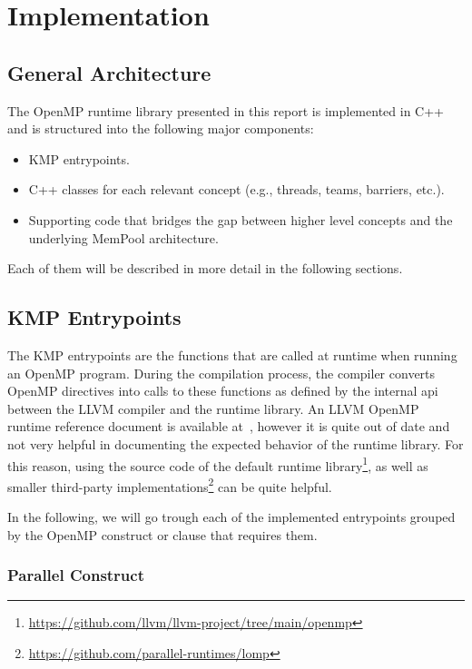 \chapter{Implementation}
\label{ch:implementation}

\section{General Architecture}
\label{sec:general-architecture}

The OpenMP runtime library presented in this report is implemented in C++ and is structured into
the following major components:

\begin{itemize}
	\item KMP entrypoints.
	\item C++ classes for each relevant concept (e.g., threads, teams, barriers, etc.).
	\item Supporting code that bridges the gap between higher level concepts and the underlying
	      MemPool architecture.
\end{itemize}

Each of them will be described in more detail in the following sections.

\section{KMP Entrypoints}
\label{sec:kmp-entrypoints}

The KMP entrypoints are the functions that are called at runtime when running an OpenMP program.
During the compilation process, the compiler converts OpenMP directives into calls to these
functions as defined by the internal \gls{api} between the LLVM compiler and the runtime library. An
LLVM OpenMP runtime reference document is available at~\cite{kmpref}, however it is quite out of date
and not very helpful in documenting the expected behavior of the runtime library. For this reason,
using the source code of the default runtime
library\footnote{\url{https://github.com/llvm/llvm-project/tree/main/openmp}}, as well as smaller
third-party implementations\footnote{\url{https://github.com/parallel-runtimes/lomp}} can be quite
helpful.

In the following, we will go trough each of the implemented entrypoints grouped by the OpenMP
construct or clause that requires them.

\subsection{Parallel Construct}
\label{subsec:parallel-construct}


